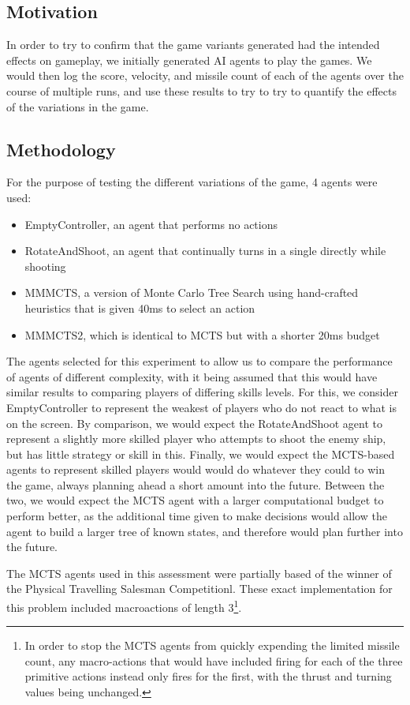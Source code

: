 \subsection{Motivation}

In order to try to confirm that the game variants generated had the intended effects on gameplay, we initially generated AI agents to play the games. We would then log the score, velocity, and missile count of each of the agents over the course of multiple runs, and use these results to try to try to quantify the effects of the variations in the game.

\subsection{Methodology}

For the purpose of testing the different variations of the game, 4 agents were used:
\begin{itemize}
	\item EmptyController, an agent that performs no actions
	\item RotateAndShoot, an agent that continually turns in a single directly while shooting
	\item MMMCTS, a version of Monte Carlo Tree Search using hand-crafted heuristics that is given 40ms to select an action
	\item MMMCTS2, which is identical to MCTS but with a shorter 20ms budget
\end{itemize}

The agents selected for this experiment to allow us to compare the performance of agents of different complexity, with it being assumed that this would have similar results to comparing players of differing skills levels. For this, we consider EmptyController to represent the weakest of players who do not react to what is on the screen. By comparison, we would expect the RotateAndShoot agent to represent a slightly more skilled player who attempts to shoot the enemy ship, but has little strategy or skill in this. Finally, we would expect the MCTS-based agents to represent skilled players would would do whatever they could to win the game, always planning ahead a short amount into the future. Between the two, we would expect the MCTS agent with a larger computational budget to perform better, as the additional time given to make decisions would allow the agent to build a larger tree of known states, and therefore would plan further into the future.

The MCTS agents used in this assessment were partially based of the winner of the Physical Travelling Salesman Competitionl\cite{6374161}. These exact implementation for this problem included macroactions of length 3\footnote{In order to stop the MCTS agents from quickly expending the limited missile count, any macro-actions that would have included firing for each of the three primitive actions instead only fires for the first, with the thrust and turning values being unchanged.}. 

